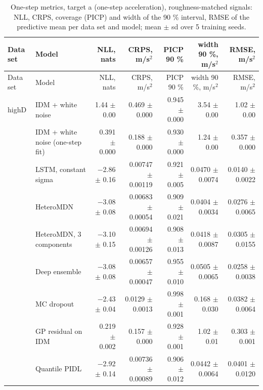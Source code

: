\begingroup
\footnotesize
\begin{longtable}{llrrrrr}
\caption{One-step metrics, target a (one-step acceleration), roughness-matched signals: NLL, CRPS, coverage (PICP) and width of the 90 \% interval, RMSE of the predictive mean per data set and model; mean $\pm$ sd over 5 training seeds.}\label{tab:t1-one-step--matched--a} \\
\toprule
Data set & Model & NLL, nats & CRPS, m/s$^2$ & PICP 90 \% & width 90 \%, m/s$^2$ & RMSE, m/s$^2$ \\
\midrule
\endfirsthead
\toprule
Data set & Model & NLL, nats & CRPS, m/s$^2$ & PICP 90 \% & width 90 \%, m/s$^2$ & RMSE, m/s$^2$ \\
\midrule
\endhead
\bottomrule
\endlastfoot
highD & IDM + white noise & 1.44 $\pm$ 0.00 & 0.469 $\pm$ 0.000 & 0.945 $\pm$ 0.000 & 3.54 $\pm$ 0.00 & 1.02 $\pm$ 0.00 \\
 & IDM + white noise (one-step fit) & 0.391 $\pm$ 0.000 & 0.188 $\pm$ 0.000 & 0.930 $\pm$ 0.000 & 1.24 $\pm$ 0.00 & 0.357 $\pm$ 0.000 \\
 & LSTM, constant sigma & $-$2.86 $\pm$ 0.16 & 0.00747 $\pm$ 0.00119 & 0.921 $\pm$ 0.005 & 0.0470 $\pm$ 0.0074 & 0.0140 $\pm$ 0.0022 \\
 & HeteroMDN & $-$3.08 $\pm$ 0.08 & 0.00683 $\pm$ 0.00054 & 0.909 $\pm$ 0.021 & 0.0404 $\pm$ 0.0034 & 0.0276 $\pm$ 0.0065 \\
 & HeteroMDN, 3 components & $-$3.10 $\pm$ 0.15 & 0.00694 $\pm$ 0.00126 & 0.908 $\pm$ 0.013 & 0.0418 $\pm$ 0.0087 & 0.0305 $\pm$ 0.0155 \\
 & Deep ensemble & $-$3.08 $\pm$ 0.08 & 0.00657 $\pm$ 0.00047 & 0.955 $\pm$ 0.010 & 0.0505 $\pm$ 0.0065 & 0.0258 $\pm$ 0.0038 \\
 & MC dropout & $-$2.43 $\pm$ 0.04 & 0.0129 $\pm$ 0.0013 & 0.998 $\pm$ 0.001 & 0.168 $\pm$ 0.030 & 0.0382 $\pm$ 0.0064 \\
 & GP residual on IDM & 0.219 $\pm$ 0.002 & 0.157 $\pm$ 0.000 & 0.928 $\pm$ 0.001 & 1.02 $\pm$ 0.01 & 0.303 $\pm$ 0.001 \\
 & Quantile PIDL & $-$2.92 $\pm$ 0.14 & 0.00736 $\pm$ 0.00089 & 0.906 $\pm$ 0.012 & 0.0442 $\pm$ 0.0064 & 0.0401 $\pm$ 0.0120 \\

\end{longtable}
